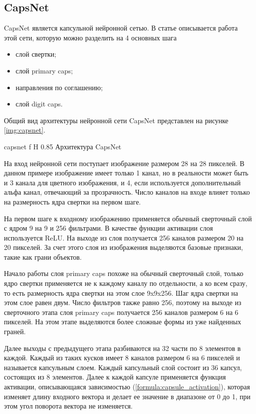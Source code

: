 \subsection{CapsNet}

CapsNet является капсульной нейронной сетью. В статье \cite{capsule3} описывается работа этой сети, которую можно разделить на 4 основных шага
\begin{itemize}
	\item слой свертки;
	\item слой primary caps;
	\item направления по соглашению;
	\item слой digit caps.
\end{itemize}

Общий вид архитектуры нейронной сети CapsNet представлен на рисунке \ref{img:capsnet}.

{capsnet} %
{f} %
{H} %
{0.85\textwidth} %
{Архитектура CapsNet} %

На вход нейронной сети поступает изображение размером 28 на 28 пикселей. В данном примере изображение имеет только 1 канал, но в реальности может быть и 3 канала для цветного изображения, и 4, если используется дополнительный альфа канал, отвечающий за прозрачность. Число каналов на входе влияет только на размерность ядра свертки на первом шаге.

На первом шаге к входному изображению применяется обычный сверточный слой с ядром 9 на 9 и 256 фильтрами. В качестве функции активации слоя используется ReLU. На выходе из слоя получается 256 каналов размером 20 на 20 пикселей. За счет этого слоя из изображения выделяются базовые признаки, такие как грани объектов.

Начало работы слоя primary caps похоже на обычный сверточный слой, только ядро свертки применяется не к каждому каналу по отдельности, а ко всем сразу, то есть размерность ядра свертки на этом слое 9x9x256. Шаг ядра свертки на этом слое равен двум. Число фильтров также равно 256, поэтому на выходе из сверточного этапа слоя primary caps получается 256 каналов размером 6 на 6 пикселей. На этом этапе выделяются более сложные формы из уже найденных граней.

Далее выходы с предыдущего этапа разбиваются на 32 части по 8 элементов в каждой. Каждый из таких кусков имеет 8 каналов размером 6 на 6 пикселей и называется капсульным слоем. Каждый капсульный слой состоит из 36 капсул, состоящих из 8 элементов. Далее к каждой капсуле применяется функция активации, описывающаяся зависимостью (\ref{formula:capsule_activation}), которая изменяет длину входного вектора и делает ее значение в диапазоне от 0 до 1, при этом угол поворота вектора не изменяется.

